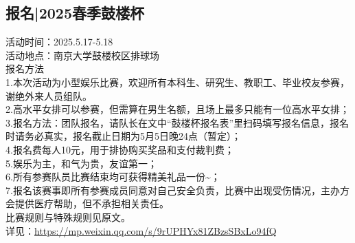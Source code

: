 \documentclass[letterpaper, 12pt]{article}
\begin{document}
\begin{multicols}{2}
\subsection{报名|2025春季鼓楼杯} %
活动时间：2025.5.17-5.18
\\活动地点：南京大学鼓楼校区排球场
\\报名方法 
\\1.本次活动为小型娱乐比赛，欢迎所有本科生、研究生、教职工、毕业校友参赛，谢绝外来人员组队。
\\2.高水平女排可以参赛，但需算在男生名额，且场上最多只能有一位高水平女排；
\\3.报名方法：团队报名，请队长在文中“鼓楼杯报名表”里扫码填写报名信息，报名时请务必真实，报名截止日期为5月5日晚24点（暂定）；
\\4.报名费每人10元，用于排协购买奖品和支付裁判费；
\\5.娱乐为主，和气为贵，友谊第一；
\\6.所有参赛队员比赛结束均可获得精美礼品一份\textasciitilde{}；
\\7.报名该赛事即所有参赛成员同意对自己安全负责，比赛中出现受伤情况，主办方会提供医疗帮助，但不承担相关责任。
\\比赛规则与特殊规则见原文。
\\详见：\url{https://mp.weixin.qq.com/s/9rUPHYx81ZBzsSBxLo94fQ}
\end{multicols}
\end{document}
